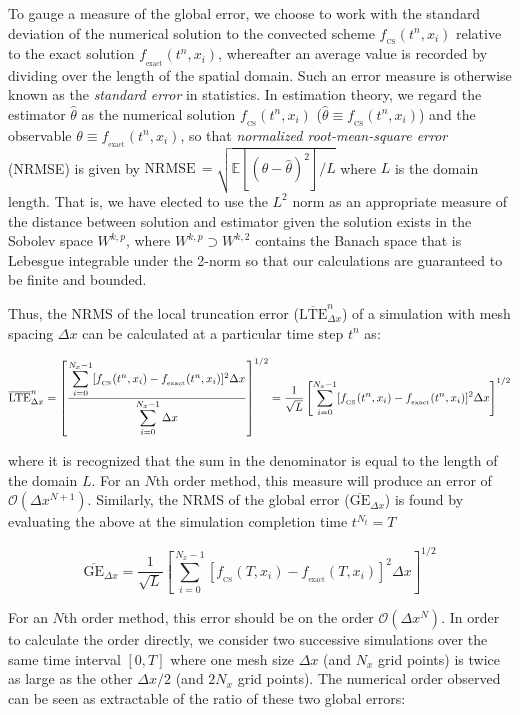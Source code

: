 \documentclass[11pt,titlepage]{report}
\begin{document}
To gauge a measure of the global error, we choose to work with the standard deviation of the numerical solution to the convected scheme $f_{_{\mathrm{CS}}}(t^n,x_i)$ relative to the exact solution $f_{_{\mathrm{exact}}}(t^n,x_i)$, whereafter an average value is recorded by dividing over the length of the spatial domain. Such an error measure is otherwise known as the \emph{standard error} in statistics. In estimation theory, we regard the estimator $\hat{\theta}$ as the numerical solution $f_{_{\mathrm{CS}}}(t^n,x_i)$ ($\hat{\theta} \equiv f_{_{\mathrm{CS}}}(t^n,x_i)$) and the observable $\theta \equiv f_{_{\mathrm{exact}}}(t^n,x_i)$, so that \emph{normalized root-mean-square error} (NRMSE) is given by $\text{NRMSE}\, = \sqrt{\mathbb{E}[(\theta - \hat{\theta})^2] / L}$ where $L$ is the domain length. That is, we have elected to use the $L^2$ norm as an appropriate measure of the distance between solution and estimator given the solution exists in the Sobolev space $W^{k,p}$, where $W^{k,p} \supset W^{k,2}$ contains the Banach space that is Lebesgue integrable under the 2-norm so that our calculations are guaranteed to be finite and bounded.


Thus, the NRMS of the local truncation error ($\overline{\text{LTE}}_{\Delta x}^n$) of a simulation with mesh spacing $\Delta x$ can be calculated at a particular time step $t^n$ as:

$$\overline{\text{LTE}}^n_{\Delta x} = \left[\frac{\mathlarger{\sum}\limits_{i = 0}^{N_x - 1} [f_{_{\mathrm{CS}}}(t^n,x_i) - f_{_{\mathrm{exact}}}(t^n,x_i)]^2\Delta x}{\mathlarger{\sum}\limits_{i = 0}^{N_x-1} \,\Delta x}\right]^{1/2} = \frac{1}{\sqrt{L}}\left[\sum\limits_{i = 0}^{N_x - 1} [f_{_{\mathrm{CS}}}(t^n,x_i) - f_{_{\mathrm{exact}}}(t^n,x_i)]^2\Delta x\right]^{1/2}$$

\noindent where it is recognized that the sum in the denominator is equal to the length of the domain $L$. For an $N$th order method, this measure will produce an error of $\mathcal{O}(\Delta x^{N+1})$. Similarly, the NRMS of the global error ($\overline{\text{GE}}_{\Delta x}$) is found by evaluating the above at the simulation completion time $t^{N_t} = T$

\begin{equation}
\label{eq:GE}
\overline{\text{GE}}_{\Delta x} = \frac{1}{\sqrt{L}}\left[\sum\limits_{i = 0}^{N_x - 1} [f_{_{\mathrm{CS}}}(T,x_i) - f_{_{\mathrm{exact}}}(T,x_i)]^2\Delta x\right]^{1/2}
\end{equation}

\noindent For an $N$th order method, this error should be on the order $\mathcal{O}(\Delta x^N)$. In order to calculate the order directly, we consider two successive simulations over the same time interval $[0,T]$ where one mesh size $\Delta x$ (and $N_x$ grid points) is twice as large as the other $\Delta x / 2$ (and $2N_x$ grid points). The numerical order observed can be seen as extractable of the ratio of these two global errors:
\end{document}
